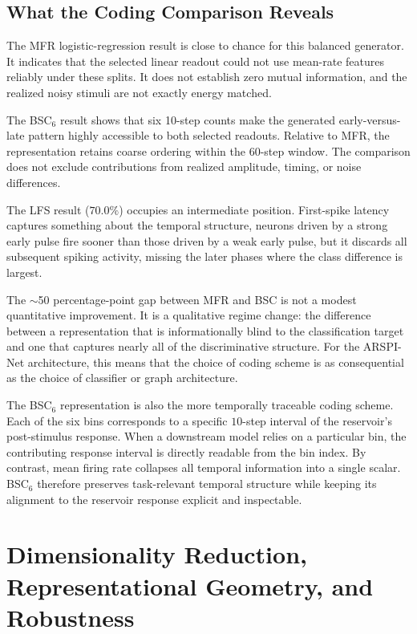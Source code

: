 \subsection{What the Coding Comparison Reveals}

The MFR logistic-regression result is close to chance for this balanced generator. It indicates that the selected linear readout could not use mean-rate features reliably under these splits. It does not establish zero mutual information, and the realized noisy stimuli are not exactly energy matched.

The BSC$_6$ result shows that six 10-step counts make the generated early-versus-late pattern highly accessible to both selected readouts. Relative to MFR, the representation retains coarse ordering within the 60-step window. The comparison does not exclude contributions from realized amplitude, timing, or noise differences.

The LFS result ($70.0\%$) occupies an intermediate position. First-spike latency captures something about the temporal structure, neurons driven by a strong early pulse fire sooner than those driven by a weak early pulse, but it discards all subsequent spiking activity, missing the later phases where the class difference is largest.

The $\sim$50 percentage-point gap between MFR and BSC is not a modest quantitative improvement. It is a qualitative regime change: the difference between a representation that is informationally blind to the classification target and one that captures nearly all of the discriminative structure. For the ARSPI-Net architecture, this means that the choice of coding scheme is as consequential as the choice of classifier or graph architecture.

The BSC$_6$ representation is also the more temporally traceable coding scheme. Each of the six bins corresponds to a specific $10$-step interval of the reservoir's post-stimulus response. When a downstream model relies on a particular bin, the contributing response interval is directly readable from the bin index. By contrast, mean firing rate collapses all temporal information into a single scalar. BSC$_6$ therefore preserves task-relevant temporal structure while keeping its alignment to the reservoir response explicit and inspectable.


\section{Dimensionality Reduction, Representational Geometry, and Robustness}
\label{sec:pca_robustness}


